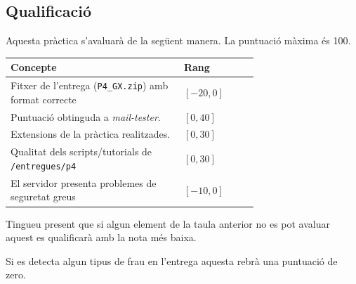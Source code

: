\documentclass{practicaitic}
\begin{document}
\subsection{Qualificació}

Aquesta pràctica s'avaluarà de la següent manera. La puntuació màxima és 100.

\begin{center}%
  \begin{tabular}{p{0.7\linewidth} l}
  \hline
  Concepte & Rang \\ \hline
  Fitxer de l'entrega (\texttt{P4\_GX.zip}) amb format correcte & $[-20, 0]$ \\
  Puntuació obtinguda a \textit{mail-tester}. & $[0, 40]$ \\
  Extensions de la pràctica realitzades. & $[0, 30]$ \\
  Qualitat dels scripts/tutorials de \texttt{/entregues/p4} & $[0,30]$ \\
  El servidor presenta problemes de seguretat greus & $[-10,0]$ \\
  \hline
  \end{tabular}
\end{center}

Tingueu present que si algun element de la taula anterior no es pot avaluar
aquest es qualificarà amb la nota més baixa.

Si es detecta algun tipus de frau en l'entrega aquesta rebrà una puntuació de zero.
\end{document}
